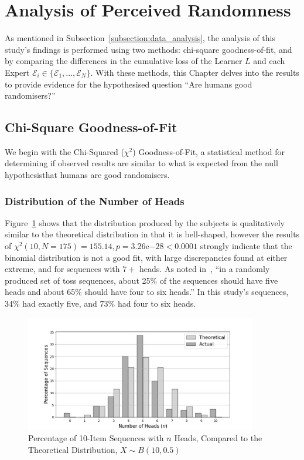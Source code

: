\section{Analysis of Perceived Randomness}\label{section:analysis_of_perceived_randomness}
As mentioned in Subsection~\ref{subsection:data_analysis}, the analysis of this study's findings is performed using two methods: chi-square goodness-of-fit, and by comparing the differences in the cumulative loss of the Learner $L$ and each Expert $\mathcal{E}_i \in \{\mathcal{E}_1,\ldots, \mathcal{E}_N\}$. With these methods, this Chapter delves into the results to provide evidence for the hypothesised question ``Are humans good randomisers?''

\subsection{Chi-Square Goodness-of-Fit}\label{subsection:chi-square_goodness-of-fit}
We begin with the Chi-Squared ($\chi^2$) Goodness-of-Fit, a statistical method for determining if observed results are similar to what is expected from the null hypothesis\textemdash{}that humans are good randomisers.

\subsubsection{Distribution of the Number of Heads}
Figure~\ref{distribution_of_the_number_of_heads} shows that the distribution produced by the subjects is qualitatively similar to the theoretical distribution in that it is bell-shaped, however the results of $\chi^2(10, N=175) = 155.14, p=3.26\mathrm{e}{-28} < 0.0001$ strongly indicate that the binomial distribution is not a good fit, with large discrepancies found at either extreme, and for sequences with $7+$ heads. As noted in~\cite{nickerson:2009}, ``in a randomly produced set of toss sequences, about 25\% of the sequences should have five heads and about 65\% should have four to six heads.'' In this study's sequences, 34\% had exactly five, and 73\% had four to six heads.

\begin{figure}[h]
    \centering
    \includegraphics[width=0.9\textwidth]{images/combined_number_of_heads.jpg}
    \caption{Percentage of 10-Item Sequences with $n$ Heads, Compared to the Theoretical Distribution, $X \sim B(10, 0.5)$}\label{distribution_of_the_number_of_heads}
\end{figure}

